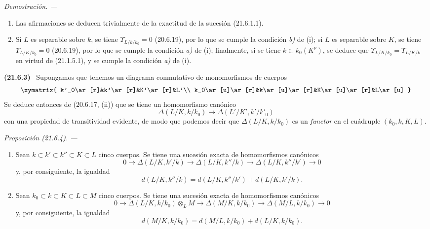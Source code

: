 \documentclass[10pt,oneside]{book}
\makeatletter
\newcommand{\setmanualcurrentlabel}[1]{\def\@currentlabel{#1}}
\newcommand{\oldpage}[2][]{%
  \setcounter{footnote}{0}%
  \marginpar{\scriptsize\textbf{#1}~|~#2}\ignorespaces}
\newenvironment{env}[1][]{\setmanualcurrentlabel{#1}\par\medskip\noindent\textbf{(#1)}\ }{\par}
\newenvironment{proposition}[1][]{%
  \setmanualcurrentlabel{#1}\par\medskip\noindent\itshape Proposición (#1). ---\ }{\par}
\newenvironment{proof}{%
  \par\medskip\noindent\textit{Demostración. ---\ }}{\par}
\makeatother
\begin{document}
\begin{proof}
\begin{enumerate}
  \item[(i)] Las afirmaciones se deducen trivialmente de la exactitud de la sucesión
  (21.6.1.1).
  \item[(ii)] Si $L$ es separable sobre $k$, se tiene
  $\Upsilon_{L/k/k_0}=0$ (20.6.19), por lo que se cumple la condición \emph{b)} de (i);
  si $L$ es separable sobre $K$, se tiene
  $\Upsilon_{L/K/k_0}=0$ (20.6.19), por lo que se cumple la condición \emph{a)} de (i);
  finalmente, si se tiene $k\subset k_0(K^p)$, se deduce que
  $\Upsilon_{L/K/k_0}=\Upsilon_{L/K/k}$ en virtud de (21.1.5.1), y se cumple
  la condición \emph{a)} de (i).
\end{enumerate}
\end{proof}
\oldpage[0\textsubscript{IV-1}]{168}
\begin{env}[21.6.3]
\label{0.21.6.3-es}
Supongamos que tenemos un diagrama conmutativo de monomorfismos de cuerpos
\[
\xymatrix{
 k'_0\ar[r]&k'\ar[r]&K'\ar[r]&L'\\
 k_0\ar[u]\ar[r]&k\ar[u]\ar[r]&K\ar[u]\ar[r]&L\ar[u]
}
\]
Se deduce entonces de (20.6.17, (ii)) que se tiene un homomorfismo canónico
\begin{equation}
\tag{21.6.3.1}
\label{0.21.6.3.1-es}
\Delta(L/K,k/k_0)\longrightarrow\Delta(L'/K',k'/k'_0)
\end{equation}
con una propiedad de transitividad evidente, de modo que podemos decir que
$\Delta(L/K,k/k_0)$ es un \emph{functor} en el cuádruple
$(k_0,k,K,L)$.
\end{env}

\begin{proposition}[21.6.4]
\label{0.21.6.4-es}
\begin{enumerate}
  \item[\rm (i)] Sean $k\subset k'\subset k''\subset K\subset L$ cinco cuerpos.
  Se tiene una sucesión exacta de homomorfismos canónicos
\begin{equation}
\tag{21.6.4.1}
\label{0.21.6.4.1-es}
0\to\Delta(L/K,k'/k)\to\Delta(L/K,k''/k)\to\Delta(L/K,k''/k')\to0
\end{equation}
y, por consiguiente, la igualdad
\begin{equation}
\tag{21.6.4.2}
\label{0.21.6.4.2-es}
d(L/K,k''/k)=d(L/K,k''/k')+d(L/K,k'/k).
\end{equation}
  \item[\rm (ii)] Sean $k_0\subset k\subset K\subset L\subset M$ cinco cuerpos.
  Se tiene una sucesión exacta de homomorfismos canónicos
\begin{equation}
\tag{21.6.4.3}
\label{0.21.6.4.3-es}
0\to\Delta(L/K,k/k_0)\otimes_LM\to\Delta(M/K,k/k_0)
\to\Delta(M/L,k/k_0)\to0
\end{equation}
y, por consiguiente, la igualdad
\begin{equation}
\tag{21.6.4.4}
\label{0.21.6.4.4-es}
d(M/K,k/k_0)=d(M/L,k/k_0)+d(L/K,k/k_0).
\end{equation}
\end{enumerate}
\end{proposition}
\end{document}

